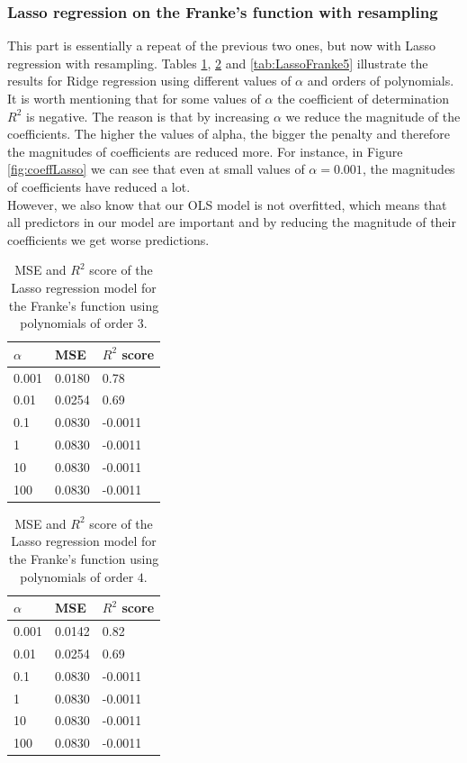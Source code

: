\documentclass [11pt]{article}
\begin{document}
\subsubsection{Lasso regression on the Franke's function  with resampling}
 
This part is essentially a repeat of the previous two ones, but now with Lasso regression with resampling. Tables \ref{tab:LassoFranke3}, \ref{tab:LassoFranke4} and \ref{tab:LassoFranke5} illustrate the results for Ridge regression using different values of $\alpha$ and orders of polynomials.\\
It is worth mentioning that for some values of $\alpha$ the coefficient of determination $R^{2}$ is negative. The reason is that by increasing $\alpha$ we reduce the magnitude of the coefficients. The higher the values of alpha, the bigger the penalty and therefore the magnitudes of coefficients are reduced more. For instance, in Figure \ref{fig:coeffLasso} we can see that even at small values of $\alpha=0.001$, the magnitudes of coefficients have reduced a lot.\\
However, we also know that our OLS model is not overfitted, which means that all predictors in our model are important and by reducing the magnitude of their coefficients we get worse predictions. 


\begin{table}[H]
\centering
\begin{tabular}{lll}
\hline
$\alpha$ & MSE    & $R^{2}$ score \\ \hline
0.001     & 0.0180 & 0.78          \\
0.01      & 0.0254 & 0.69          \\
0.1       & 0.0830 & -0.0011       \\
1         & 0.0830 & -0.0011       \\
10        & 0.0830 & -0.0011       \\
100       & 0.0830 & -0.0011       \\ \hline
\end{tabular}
\caption{MSE and $R^{2}$ score of the Lasso regression model for the Franke's function using polynomials of order $3$.}
\label{tab:LassoFranke3}
\end{table}

\begin{table}[H]
\centering
\begin{tabular}{lll}
\hline
$\alpha$ & MSE    & $R^{2}$ score \\ \hline
0.001     & 0.0142 & 0.82          \\
0.01      & 0.0254 & 0.69          \\
0.1       & 0.0830 & -0.0011       \\
1         & 0.0830 & -0.0011       \\
10        & 0.0830 & -0.0011       \\
100       & 0.0830 & -0.0011       \\ \hline
\end{tabular}
\caption{{MSE and $R^{2}$ score of the Lasso regression model for the Franke's function using polynomials of order $4$.}}
\label{tab:LassoFranke4}
\end{table}
\end{document}
